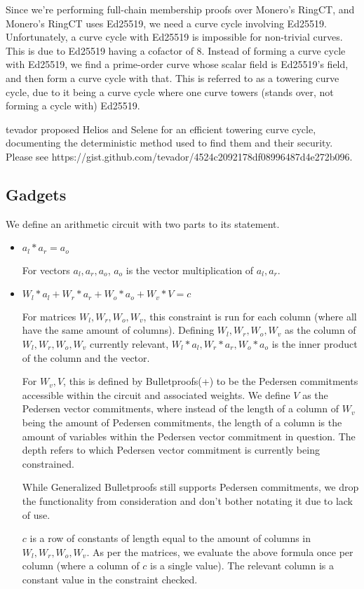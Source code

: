 \documentclass[]{article}
\begin{document}
Since we're performing full-chain membership proofs over Monero's RingCT, and Monero's RingCT uses Ed25519, we need a curve cycle involving Ed25519. Unfortunately, a curve cycle with Ed25519 is impossible for non-trivial curves. This is due to Ed25519 having a cofactor of 8. Instead of forming a curve cycle with Ed25519, we find a prime-order curve whose scalar field is Ed25519's field, and then form a curve cycle with that. This is referred to as a towering curve cycle, due to it being a curve cycle where one curve towers (stands over, not forming a cycle with) Ed25519.

tevador proposed Helios and Selene for an efficient towering curve cycle, documenting the deterministic method used to find them and their security. Please see https://gist.github.com/tevador/4524c2092178df08996487d4e272b096.

\subsection{Gadgets}

We define an arithmetic circuit with two parts to its statement.

\begin{itemize}
	\item
	$a_l * a_r = a_o$
	
	For vectors $a_l, a_r, a_o$, $a_o$ is the vector multiplication of $a_l, a_r$.
	\item
	$W_l * a_l + W_r * a_r + W_o * a_o + W_v * V = c$
	
	For matrices $W_l, W_r, W_o, W_v$, this constraint is run for each column (where all have the same amount of columns). Defining $W_l, W_r, W_o, W_v$ as the column of $W_l, W_r, W_o, W_v$ currently relevant, $W_l * a_l, W_r * a_r, W_o * a_o$ is the inner product of the column and the vector.
	
	For $W_v, V$, this is defined by Bulletproofs(+) to be the Pedersen commitments accessible within the circuit and associated weights. We define $V$ as the Pedersen vector commitments, where instead of the length of a column of $W_v$ being the amount of Pedersen commitments, the length of a column is the amount of variables within the Pedersen vector commitment in question. The depth refers to which Pedersen vector commitment is currently being constrained.
	
	While Generalized Bulletproofs still supports Pedersen commitments, we drop the functionality from consideration and don't bother notating it due to lack of use.
	
	$c$ is a row of constants of length equal to the amount of columns in $W_l, W_r, W_o, W_v$. As per the matrices, we evaluate the above formula once per column (where a column of $c$ is a single value). The relevant column is a constant value in the constraint checked.
\end{itemize}
\end{document}
